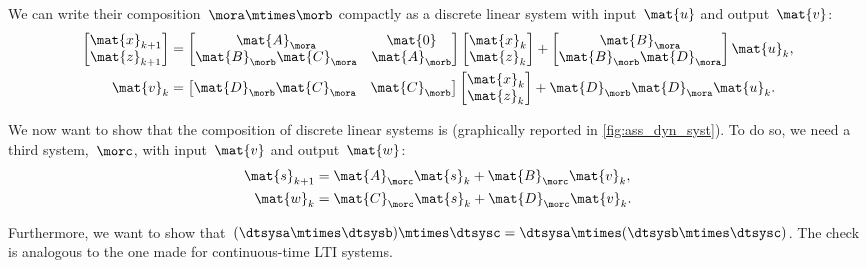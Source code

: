 We can write their composition~$\mora\mtimes \morb$ compactly as a discrete linear system with input~$\mat{u}$ and output~$\mat{v}$:
%
\begin{equation}
    \label{eq:dlin-3}
    \begin{aligned}
        \begin{bmatrix}
            \mat{x}_{k+1} \\
            \mat{z}_{k+1}
        \end{bmatrix} & =
        \begin{bmatrix}
            \mat{A}_\mora               & \mat{0}       \\
            \mat{B}_\morb \mat{C}_\mora & \mat{A}_\morb
        \end{bmatrix}
        \begin{bmatrix}
            \mat{x}_k \\ \mat{z}_k
        \end{bmatrix}
        +
        \begin{bmatrix}
            \mat{B}_\mora \\ \mat{B}_\morb \mat{D}_\mora
        \end{bmatrix}\mat{u}_k, \\
        \mat{v}_k        & =
        \begin{bmatrix}
            \mat{D}_\morb \mat{C}_\mora & \mat{C}_\morb
        \end{bmatrix}
        \begin{bmatrix}
            \mat{x}_k \\ \mat{z}_k
        \end{bmatrix}+ \mat{D}_\morb \mat{D}_\mora \mat{u}_k.
    \end{aligned}
\end{equation}

We now want to show that the composition of discrete linear systems is  (graphically reported in \cref{fig:ass_dyn_syst}).
To do so, we need a third system,~$\morc$, with input~$\mat{v}$ and output~$\mat{w}$:
\begin{equation}
    \label{eq:dlin-4}
    \begin{aligned}
        \mat{s}_{k+1} & = \mat{A}_\morc \mat{s}_k + \mat{B}_\morc \mat{v}_k, \\
        \mat{w}_{k}   & = \mat{C}_\morc \mat{s}_k+ \mat{D}_\morc \mat{v}_k.
    \end{aligned}
\end{equation}

Furthermore, we want to show that~$(\dtsysa\mtimes \dtsysb)\mtimes \dtsysc=\dtsysa\mtimes (\dtsysb\mtimes \dtsysc)$.
The check is analogous to the one made for continuous-time LTI systems.

